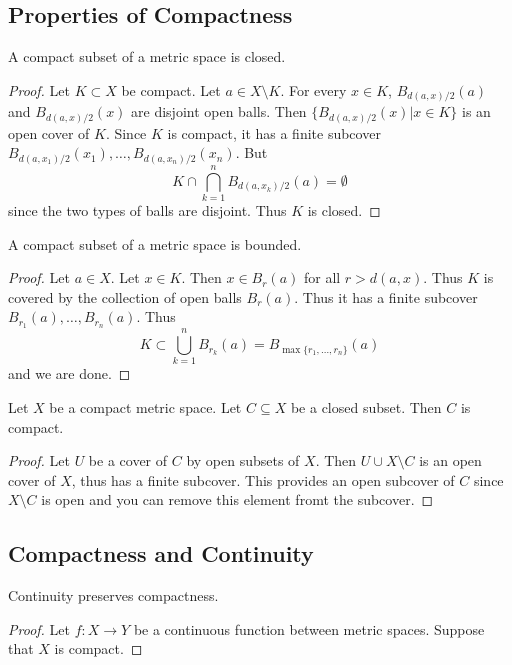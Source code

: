 \documentclass[a4paper]{article}
\begin{document}
\subsection{Properties of Compactness}
\begin{prp}{}{} A compact subset of a metric space is closed. \tcbline
\begin{proof}
Let $K\subset X$ be compact. Let $a\in X\setminus K$. For every $x\in K$, $B_{d(a,x)/2}(a)$ and $B_{d(a,x)/2}(x)$ are disjoint open balls. Then $\{B_{d(a,x)/2}(x)|x\in K\}$ is an open cover of $K$. Since $K$ is compact, it has a finite subcover $B_{d(a,x_1)/2}(x_1),\dots,B_{d(a,x_n)/2}(x_n)$. But $$K\cap\bigcap_{k=1}^nB_{d(a,x_k)/2}(a)=\emptyset$$ since the two types of balls are disjoint. Thus $K$ is closed. 
\end{proof}
\end{prp}

\begin{prp}{}{} A compact subset of a metric space is bounded. \tcbline
\begin{proof}
Let $a\in X$. Let $x\in K$. Then $x\in B_r(a)$ for all $r>d(a,x)$. Thus $K$ is covered by the collection of open balls $B_r(a)$. Thus it has a finite subcover $B_{r_1}(a),\dots,B_{r_n}(a)$. Thus $$K\subset\bigcup_{k=1}^nB_{r_k}(a)=B_{\max\{r_1,\dots,r_n\}}(a)$$ and we are done. 
\end{proof}
\end{prp}

\begin{prp}{}{} Let $X$ be a compact metric space. Let $C\subseteq X$ be a closed subset. Then $C$ is compact. \tcbline
\begin{proof}
Let $U$ be a cover of $C$ by open subsets of $X$. Then $U\cup X\setminus C$ is an open cover of $X$, thus has a finite subcover. This provides an open subcover of $C$ since $X\setminus C$ is open and you can remove this element fromt the subcover. 
\end{proof}
\end{prp}

\subsection{Compactness and Continuity}
\begin{thm}{}{} Continuity preserves compactness. \tcbline
\begin{proof}
Let $f:X\to Y$ be a continuous function between metric spaces. Suppose that $X$ is compact. 
\end{proof}
\end{thm}
\end{document}
